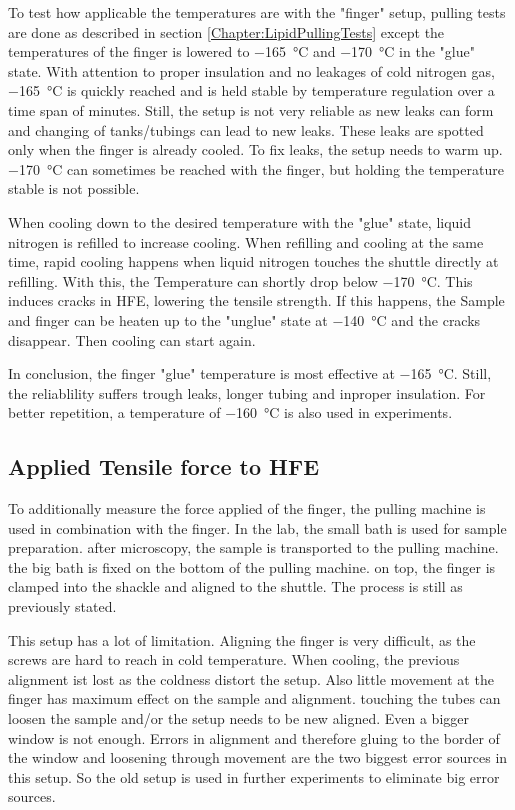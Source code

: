 To test how applicable the temperatures are with the "finger" setup, pulling tests are done as described in section \ref{Chapter:LipidPullingTests} except the temperatures of the finger is lowered to \SI{-165}{\degreeCelsius} and \SI{-170}{\degreeCelsius} in the "glue" state. With attention to proper insulation and no leakages of cold nitrogen gas, \SI{-165}{\degreeCelsius} is quickly reached and is held stable by temperature regulation over a time span of minutes. Still, the setup is not very reliable as new leaks can form and changing of tanks/tubings can lead to new leaks. These leaks are spotted only when the finger is already cooled. To fix leaks, the setup needs to warm up. \SI{-170}{\degreeCelsius} can sometimes be reached with the finger, but holding the temperature stable is not possible. 

When cooling down to the desired temperature with the "glue" state, liquid nitrogen is refilled to increase cooling. When refilling and cooling at the same time, rapid cooling happens when liquid nitrogen touches the shuttle directly at refilling. With this, the Temperature can shortly drop below \SI{-170}{\degreeCelsius}. This induces cracks in HFE, lowering the tensile strength. If this happens, the Sample and finger can be heaten up to the "unglue" state at \SI{-140}{\degreeCelsius} and the cracks disappear. Then cooling can start again.

In conclusion, the finger "glue" temperature is most effective at \SI{-165}{\degreeCelsius}. Still, the reliablility suffers trough leaks, longer tubing and inproper insulation. For better repetition, a temperature of \SI{-160}{\degreeCelsius} is also used in experiments.

\subsection{Applied Tensile force to HFE}

To additionally measure the force applied of the finger, the pulling machine is used in combination with the finger. In the lab, the small bath is used for sample preparation. after microscopy, the sample is transported to the pulling machine. the big bath is fixed on the bottom of the pulling machine. on top, the finger is clamped into the shackle and aligned to the shuttle. The process is still as previously stated. 

This setup has a lot of limitation. Aligning the finger is very difficult, as the screws are hard to reach in cold temperature. When cooling, the previous alignment ist lost as the coldness distort the setup. Also little movement at the finger has maximum effect on the sample and alignment. touching the tubes can loosen the sample and/or the setup needs to be new aligned. Even a bigger window is not enough. Errors in alignment and therefore gluing to the border of the window and loosening through movement are the two biggest error sources in this setup. So the old setup is used in further experiments to eliminate big error sources.

